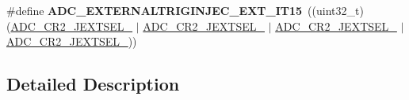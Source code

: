 \begin{DoxyCompactItemize}
\item 
\hypertarget{group___a_d_c_ex___internal___h_a_l__driver___ext__trig__src___injected_ga28406231956a406ba39de6e3e1730ff3}{\#define {\bfseries A\-D\-C\-\_\-\-E\-X\-T\-E\-R\-N\-A\-L\-T\-R\-I\-G\-I\-N\-J\-E\-C\-\_\-\-E\-X\-T\-\_\-\-I\-T15}~((uint32\-\_\-t)(\hyperlink{group___peripheral___registers___bits___definition_gae34f5dda7a153ffd927c9cd38999f822}{A\-D\-C\-\_\-\-C\-R2\-\_\-\-J\-E\-X\-T\-S\-E\-L\-\_} $\vert$ \hyperlink{group___peripheral___registers___bits___definition_ga571bb97f950181fedbc0d4756482713d}{A\-D\-C\-\_\-\-C\-R2\-\_\-\-J\-E\-X\-T\-S\-E\-L\-\_} $\vert$ \hyperlink{group___peripheral___registers___bits___definition_ga99fa4a240d34ce231d6d0543bac7fd9b}{A\-D\-C\-\_\-\-C\-R2\-\_\-\-J\-E\-X\-T\-S\-E\-L\-\_} $\vert$ \hyperlink{group___peripheral___registers___bits___definition_gaa70c1f30e2101e2177ce564440203ba3}{A\-D\-C\-\_\-\-C\-R2\-\_\-\-J\-E\-X\-T\-S\-E\-L\-\_}))}\label{group___a_d_c_ex___internal___h_a_l__driver___ext__trig__src___injected_ga28406231956a406ba39de6e3e1730ff3}

\end{DoxyCompactItemize}


\subsection{Detailed Description}
